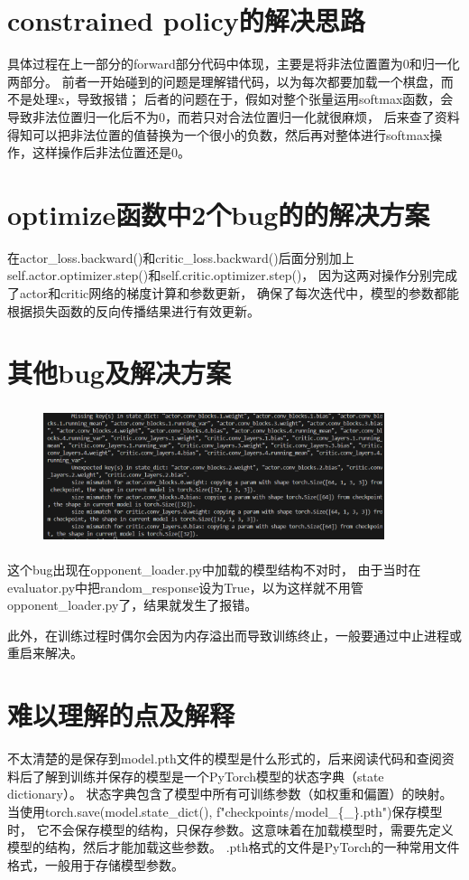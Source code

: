 \documentclass{ctexart}
\begin{document}
	\section{constrained policy的解决思路}
具体过程在上一部分的forward部分代码中体现，主要是将非法位置置为0和归一化两部分。
前者一开始碰到的问题是理解错代码，以为每次都要加载一个棋盘，而不是处理x，导致报错；
后者的问题在于，假如对整个张量运用softmax函数，会导致非法位置归一化后不为0，而若只对合法位置归一化就很麻烦，
后来查了资料得知可以把非法位置的值替换为一个很小的负数，然后再对整体进行softmax操作，这样操作后非法位置还是0。
	\section{optimize函数中2个bug的的解决方案}
	在actor\_loss.backward()和critic\_loss.backward()后面分别加上
	self.actor.optimizer.step()和self.critic.optimizer.step()，
	因为这两对操作分别完成了actor和critic网络的梯度计算和参数更新，
	确保了每次迭代中，模型的参数都能根据损失函数的反向传播结果进行有效更新。

	\section{其他bug及解决方案}
	\begin{figure}[H]
		\centering 
		\includegraphics[height=4cm,width=10cm]{3.png}
		\end{figure}
		这个bug出现在opponent\_loader.py中加载的模型结构不对时，
		由于当时在evaluator.py中把random\_response设为True，以为这样就不用管opponent\_loader.py了，结果就发生了报错。

		此外，在训练过程时偶尔会因为内存溢出而导致训练终止，一般要通过中止进程或重启来解决。
	\section{难以理解的点及解释}
	不太清楚的是保存到model.pth文件的模型是什么形式的，后来阅读代码和查阅资料后了解到训练并保存的模型是一个PyTorch模型的状态字典（state dictionary）。
	状态字典包含了模型中所有可训练参数（如权重和偏置）的映射。当使用torch.save(model.state\_dict(), f"checkpoints/model\_\{\_\}.pth")保存模型时，
	它不会保存模型的结构，只保存参数。这意味着在加载模型时，需要先定义模型的结构，然后才能加载这些参数。
	.pth格式的文件是PyTorch的一种常用文件格式，一般用于存储模型参数。
\end{document}
